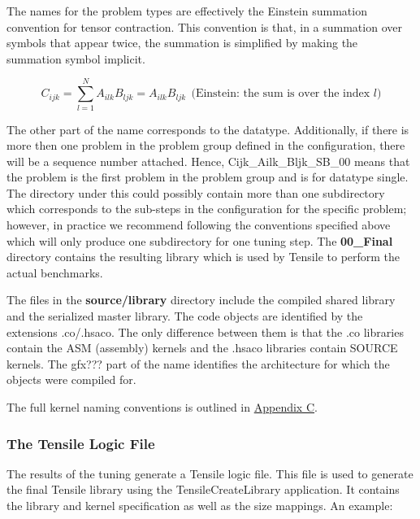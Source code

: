 \documentclass[]{article}
\begin{document}
\noindent
The names for the problem types are effectively the Einstein summation convention for tensor contraction. This convention is that, in a summation over symbols that appear twice, the summation is simplified by making the summation symbol implicit.

\[ C_{ijk} = \sum_{l=1}^{N} A_{ilk} B_{ljk} = A_{ilk} B_{ljk}\ \ \text{(Einstein: the sum is over the index $l$)}\]

The other part of the name corresponds to the datatype. Additionally, if there is more then one problem in the problem group defined in the configuration, there will be a sequence number attached. Hence, Cijk\_Ailk\_Bljk\_SB\_00 means that the problem is the first problem in the problem group and is for datatype single. The directory under this could possibly contain more than one subdirectory which corresponds to the sub-steps in the configuration for the specific problem; however, in practice we recommend following the conventions specified above which will only produce one subdirectory for one tuning step. The \textbf{00\_Final} directory contains the resulting library which is used by Tensile to perform the actual benchmarks.

The files in the \textbf{source/library} directory include the compiled shared library and the serialized master library. The code objects are identified by the extensions .co/.hsaco. The only difference between them is that the .co libraries contain the ASM (assembly) kernels and the .hsaco libraries contain SOURCE kernels. The gfx??? part of the name identifies the architecture for which the objects were compiled for.

The full kernel naming conventions is outlined in \hyperref[sec:appendixC]{Appendix C}.


\subsubsection{The Tensile Logic File}
\label{sec:logicFile}


The results of the tuning generate a Tensile logic file. This file is used to generate the final Tensile library using the TensileCreateLibrary application. It contains the library and kernel specification as well as the size mappings. An example:
\end{document}
